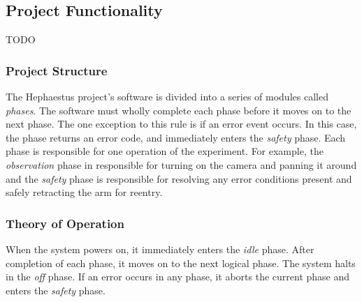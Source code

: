 \subsection{Project Functionality}
TODO

\subsubsection{Project Structure}
The Hephaestus project's software is divided into a series of modules called
\textit{phases}.
The software must wholly complete each phase before it moves on to the next
phase.
The one exception to this rule is if an error event occurs.
In this case, the phase returns an error code, and immediately enters the 
\textit{safety} phase.
Each phase is responsible for one operation of the experiment.
For example, the \textit{observation} phase in responsible for turning on the
camera and panning it around and the \textit{safety} phase is responsible for 
resolving any error conditions present and safely retracting the arm for 
reentry.

\subsubsection{Theory of Operation}
When the system powers on, it immediately enters the \textit{idle} phase.
After completion of each phase, it moves on to the next logical phase.
The system halts in the \textit{off} phase.
If an error occurs in any phase, it aborts the current phase and enters the
\textit{safety} phase.

